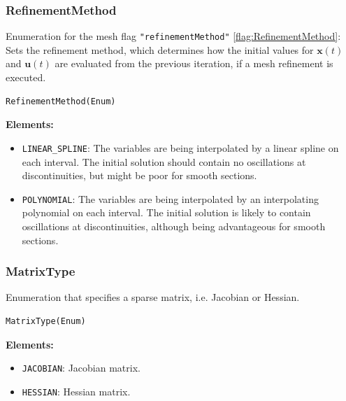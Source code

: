 \documentclass[12pt]{article}
\renewcommand{\v}{\bm}
\begin{document}
\subsubsection{RefinementMethod}

\begin{mdframed}[backgroundcolor=gray!10, roundcorner=10pt,
		linewidth=1pt]
	Enumeration for the mesh flag \texttt{"refinementMethod"}
	\eqref{flag:RefinementMethod}:
	Sets the refinement method, which determines how the initial values for
	$\v{x}(t)$ and $\v{u}(t)$ are evaluated from the previous iteration, if
	a mesh refinement is executed.

	\begin{lstlisting}
RefinementMethod(Enum)
	\end{lstlisting}
	\label{enum:RefinementMethod}
	\textbf{Elements:}
	\begin{itemize}
		\item \texttt{LINEAR\_SPLINE}: The variables are being
		      interpolated by a linear spline on each interval. The
		      initial solution
		      should contain no oscillations at discontinuities, but
		      might be poor for smooth
		      sections.
		\item \texttt{POLYNOMIAL}: The variables are being
		      interpolated by an interpolating polynomial on each
		      interval.
		      The initial solution
		      is likely to contain oscillations at discontinuities,
		      although
		      being advantageous for smooth
		      sections.
	\end{itemize}

\end{mdframed}

\subsubsection{MatrixType}
\label{c:MatrixType}
\begin{mdframed}[backgroundcolor=gray!10, roundcorner=10pt,
		linewidth=1pt]
	Enumeration that specifies a sparse matrix, i.e. Jacobian or Hessian.

	\begin{lstlisting}
MatrixType(Enum)
	\end{lstlisting}
	\label{enum:MatrixType}
	\textbf{Elements:}
	\begin{itemize}
		\item \texttt{JACOBIAN}: Jacobian matrix.
		\item \texttt{HESSIAN}: Hessian matrix.
	\end{itemize}

\end{mdframed}
\end{document}
